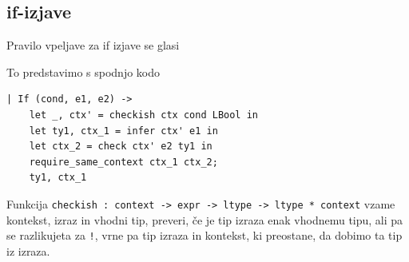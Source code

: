 \subsection{if-izjave}
Pravilo vpeljave za if izjave se glasi
\begin{prooftree}
\end{prooftree}
%
To predstavimo s spodnjo kodo
\begin{verbatim}
| If (cond, e1, e2) ->
    let _, ctx' = checkish ctx cond LBool in
    let ty1, ctx_1 = infer ctx' e1 in
    let ctx_2 = check ctx' e2 ty1 in
    require_same_context ctx_1 ctx_2;
    ty1, ctx_1
\end{verbatim}
Funkcija \verb|checkish : context -> expr -> ltype -> ltype * context| vzame kontekst, izraz in vhodni tip, preveri, če je tip izraza enak vhodnemu tipu, ali pa se razlikujeta za \verb|!|, vrne pa tip izraza in kontekst, ki preostane, da dobimo ta tip iz izraza.